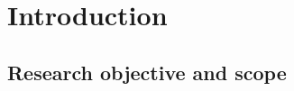
\chapter{Introduction}
\label{ch:introduction}

\section{Research objective and scope}
\label{se:objective}
